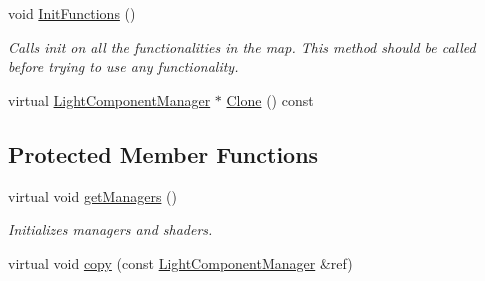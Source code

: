 \begin{DoxyCompactItemize}
\item 
\mbox{\label{class_geometry_engine_1_1_light_utils_1_1_light_component_manager_a4c7d0373018c657d5825c4cb51150097}} 
void \mbox{\hyperlink{class_geometry_engine_1_1_light_utils_1_1_light_component_manager_a4c7d0373018c657d5825c4cb51150097}{Init\+Functions}} ()
\begin{DoxyCompactList}\small\item\em Calls init on all the functionalities in the map. This method should be called before trying to use any functionality. \end{DoxyCompactList}\item 
virtual \mbox{\hyperlink{class_geometry_engine_1_1_light_utils_1_1_light_component_manager}{Light\+Component\+Manager}} $\ast$ \mbox{\hyperlink{class_geometry_engine_1_1_light_utils_1_1_light_component_manager_a10b87de25a7cc3ab14e76cc2d6889d20}{Clone}} () const
\end{DoxyCompactItemize}
\subsection*{Protected Member Functions}
\begin{DoxyCompactItemize}
\item 
\mbox{\label{class_geometry_engine_1_1_light_utils_1_1_light_component_manager_a2c201628a924f33ac8fdf6f1259ea45e}} 
virtual void \mbox{\hyperlink{class_geometry_engine_1_1_light_utils_1_1_light_component_manager_a2c201628a924f33ac8fdf6f1259ea45e}{get\+Managers}} ()
\begin{DoxyCompactList}\small\item\em Initializes managers and shaders. \end{DoxyCompactList}\item 
virtual void \mbox{\hyperlink{class_geometry_engine_1_1_light_utils_1_1_light_component_manager_a5641d12a923d4868e3e65613de335857}{copy}} (const \mbox{\hyperlink{class_geometry_engine_1_1_light_utils_1_1_light_component_manager}{Light\+Component\+Manager}} \&ref)
\end{DoxyCompactItemize}
